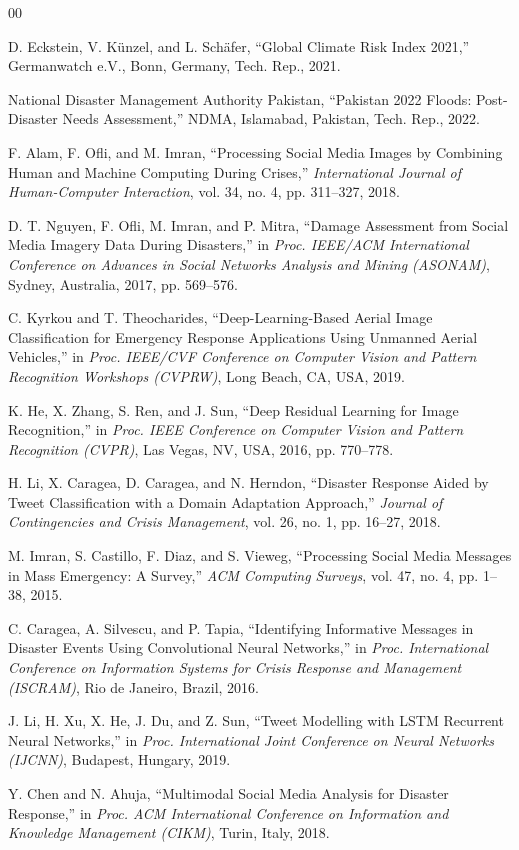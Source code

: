 \documentclass[conference]{IEEEtran}
\begin{document}
\begin{thebibliography}{00}

D. Eckstein, V. Künzel, and L. Schäfer, ``Global Climate Risk Index 2021,'' Germanwatch e.V., Bonn, Germany, Tech. Rep., 2021.

National Disaster Management Authority Pakistan, ``Pakistan 2022 Floods: Post-Disaster Needs Assessment,'' NDMA, Islamabad, Pakistan, Tech. Rep., 2022.

F. Alam, F. Ofli, and M. Imran, ``Processing Social Media Images by Combining Human and Machine Computing During Crises,'' \textit{International Journal of Human-Computer Interaction}, vol. 34, no. 4, pp. 311–327, 2018.

D. T. Nguyen, F. Ofli, M. Imran, and P. Mitra, ``Damage Assessment from Social Media Imagery Data During Disasters,'' in \textit{Proc. IEEE/ACM International Conference on Advances in Social Networks Analysis and Mining (ASONAM)}, Sydney, Australia, 2017, pp. 569–576.

C. Kyrkou and T. Theocharides, ``Deep-Learning-Based Aerial Image Classification for Emergency Response Applications Using Unmanned Aerial Vehicles,'' in \textit{Proc. IEEE/CVF Conference on Computer Vision and Pattern Recognition Workshops (CVPRW)}, Long Beach, CA, USA, 2019.

K. He, X. Zhang, S. Ren, and J. Sun, ``Deep Residual Learning for Image Recognition,'' in \textit{Proc. IEEE Conference on Computer Vision and Pattern Recognition (CVPR)}, Las Vegas, NV, USA, 2016, pp. 770–778.

H. Li, X. Caragea, D. Caragea, and N. Herndon, ``Disaster Response Aided by Tweet Classification with a Domain Adaptation Approach,'' \textit{Journal of Contingencies and Crisis Management}, vol. 26, no. 1, pp. 16–27, 2018.

M. Imran, S. Castillo, F. Diaz, and S. Vieweg, ``Processing Social Media Messages in Mass Emergency: A Survey,'' \textit{ACM Computing Surveys}, vol. 47, no. 4, pp. 1–38, 2015.

C. Caragea, A. Silvescu, and P. Tapia, ``Identifying Informative Messages in Disaster Events Using Convolutional Neural Networks,'' in \textit{Proc. International Conference on Information Systems for Crisis Response and Management (ISCRAM)}, Rio de Janeiro, Brazil, 2016.

J. Li, H. Xu, X. He, J. Du, and Z. Sun, ``Tweet Modelling with LSTM Recurrent Neural Networks,'' in \textit{Proc. International Joint Conference on Neural Networks (IJCNN)}, Budapest, Hungary, 2019.

Y. Chen and N. Ahuja, ``Multimodal Social Media Analysis for Disaster Response,'' in \textit{Proc. ACM International Conference on Information and Knowledge Management (CIKM)}, Turin, Italy, 2018.

\end{thebibliography}
\end{document}
